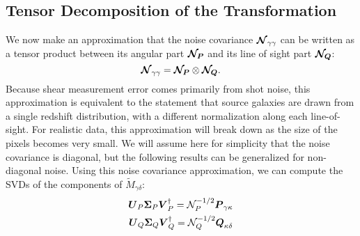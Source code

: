 \subsection{Tensor Decomposition of the Transformation}
We now make an approximation that the noise covariance 
$\boldsymbol{\mathcal{N}}_{\gamma\gamma}$ can be written as a
tensor product between its angular part $\boldsymbol{\mathcal{N}_P}$ 
and its line of sight part $\boldsymbol{\mathcal{N}_Q}$:
\begin{equation}
  \label{noise_decomp}
  \boldsymbol{\mathcal{N}}_{\gamma\gamma} 
  = \boldsymbol{\mathcal{N}_P} \otimes \boldsymbol{\mathcal{N}_Q}.
\end{equation}
Because shear measurement error comes primarily from shot noise, this 
approximation is equivalent to the statement that source galaxies are drawn 
from a single redshift distribution, with a different normalization along 
each line-of-sight.  For realistic data, this approximation will break down
as the size of the pixels becomes very small.  We will assume here for 
simplicity that the noise covariance is diagonal, but the following results
can be generalized for non-diagonal noise.  
Using this noise covariance approximation, we can compute the 
SVDs of the components of $\widetilde{M}_{\gamma\delta}$:
\begin{eqnarray}
  \boldsymbol{U}_P\boldsymbol{\Sigma}_P\boldsymbol{V}_P^\dagger = \mathcal{N}_P^{-1/2} \boldsymbol{P}_{\gamma\kappa}\nonumber\\
  \boldsymbol{U}_Q\boldsymbol{\Sigma}_Q\boldsymbol{V}_Q^\dagger = \mathcal{N}_Q^{-1/2} \boldsymbol{Q}_{\kappa\delta}
\end{eqnarray}

